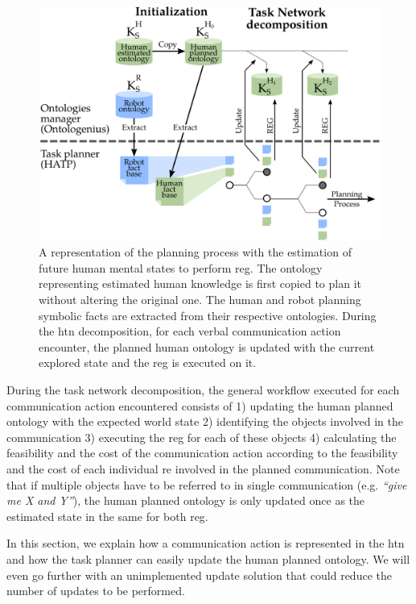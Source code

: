 \begin{figure}[!ht]
\centering
\includegraphics[scale=0.4]{figures/chapter5/integration.png}
\caption{\label{fig:chap5_integration} A representation of the planning process with the estimation of future human mental states to perform \acrshort{reg}. The ontology representing estimated human knowledge is first copied to plan it without altering the original one. The human and robot planning symbolic facts are extracted from their respective ontologies. During the \acrshort{htn} decomposition, for each verbal communication action encounter, the planned human ontology is updated with the current explored state and the \acrshort{reg} is executed on it. }
\end{figure}

During the task network decomposition, the general workflow executed for each communication action encountered consists of 1) updating the human planned ontology with the expected world state 2) identifying the objects involved in the communication 3) executing the \acrshort{reg} for each of these objects 4) calculating the feasibility and the cost of the communication action according to the feasibility and the cost of each individual \acrshort{re} involved in the planned communication. Note that if multiple objects have to be referred to in single communication (e.g. \textit{``give me X and Y''}), the human planned ontology is only updated once as the estimated state in the same for both \acrshort{reg}.

In this section, we explain how a communication action is represented in the \acrshort{htn} and how the task planner can easily update the human planned ontology. We will even go further with an unimplemented update solution that could reduce the number of updates to be performed. 


